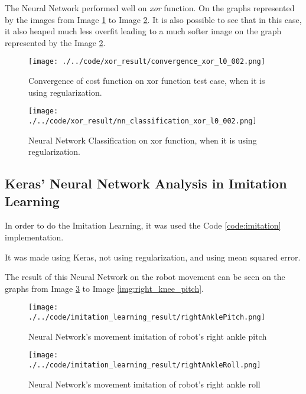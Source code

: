 \documentclass[journal]{IEEEtran}
\begin{document}
The Neural Network performed well on \textit{xor} function. On the graphs represented by the images from Image \ref{img:xor_cost_reg} to Image \ref{img:xor_classification_reg}. It is also possible to see that in this case, it also heaped much less overfit leading to a much softer image on the graph represented by the Image \ref{img:xor_classification_reg}.

\begin{figure}
  \begin{center}
  \texttt{[image: ./../code/xor\_result/convergence\_xor\_l0\_002.png]}
  \caption{Convergence of cost function on xor function test case, when it is using regularization.}
  \label{img:xor_cost_reg}
  \end{center}
\end{figure}

\begin{figure}
    \begin{center}
    \texttt{[image: ./../code/xor\_result/nn\_classification\_xor\_l0\_002.png]}
    \caption{Neural Network Classification on xor function, when it is using regularization.}
    \label{img:xor_classification_reg}
    \end{center}
\end{figure}

\subsection{Keras' Neural Network Analysis in Imitation Learning}

In order to do the Imitation Learning, it was used the Code \ref{code:imitation} implementation.

It was made using Keras, not using regularization, and using mean squared error.

The result of this Neural Network on the robot movement can be seen on the graphs from Image \ref{img:right_ankle_pitch} to Image \ref{img:right_knee_pitch}.

\begin{figure}
  \begin{center}
  \texttt{[image: ./../code/imitation\_learning\_result/rightAnklePitch.png]}
  \caption{Neural Network's movement imitation of robot's right ankle pitch}
  \label{img:right_ankle_pitch}
  \end{center}
\end{figure}

\begin{figure}
  \begin{center}
  \texttt{[image: ./../code/imitation\_learning\_result/rightAnkleRoll.png]}
  \caption{Neural Network's movement imitation of robot's right ankle roll}
  \label{img:right_ankle_roll}
  \end{center}
\end{figure}
\end{document}
